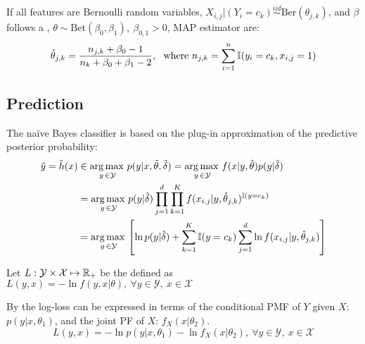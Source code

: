 If all features are Bernoulli random variables, $X_{i,j}|(Y_i=c_k)\overset{iid}{\sim}\text{Ber}(\theta_{j,k})$, and $\beta$ follows a , $\theta\sim\text{Bet}(\beta_0,\beta_1),\ \beta_{0,1}>0$, MAP estimator are:
\begin{equation*}
    \hat{\theta}_{j,k} = \frac{n_{j,k}+\beta_0-1}{n_k+\beta_0+\beta_1-2},\ \text{ where } n_{j,k}=\sum_{i=1}^n\operatorname{\mathbb{I}}(y_i=c_k,x_{i,j}=1)
\end{equation*}






\subsection{Prediction}
The naïve Bayes classifier is based on the plug-in approximation of the predictive posterior probability:
\begin{align*}
    \hat{y}=\hat{h}(x) &\in   \operatorname*{arg\,max\,}_{y\,\in\mathcal{Y}}p(y|x,\Tilde{\theta},\Tilde{\delta})  = \operatorname*{arg\,max\,}_{y\,\in\mathcal{Y}} f(x|y,\hat{\theta})p(y|\hat{\delta})\\
    &= \operatorname*{arg\,max\,}_{y\,\in\mathcal{Y}}p(y|\hat{\delta})\prod_{j=1}^d\prod_{k=1}^K  f(x_{i,j}|y,\hat{\theta}_{j,k})^{\operatorname{\mathbb{I}}(y=c_k)}\\
    &= \operatorname*{arg\,max\,}_{y\,\in\mathcal{Y}}\left[ \ln p(y|\hat{\delta})+\sum_{k=1}^K\operatorname{\mathbb{I}}(y=c_k)\sum_{j=1}^d  \ln f(x_{i,j}|y,\hat{\theta}_{j,k})\right]
\end{align*}




\clearpage
Let $L:\mathcal{Y}\times\mathcal{X}\mapsto\operatorname{\mathbb{R}}_+$ be the  defined as $L(y,x) = -\ln f(y,x|\theta),\ \forall y\in\mathcal{Y},\ x\in\mathcal{X}$









By  the log-loss can be expressed in terms of the conditional PMF of $Y$ given $X$: $p(y|x,\theta_1)$, and the joint PF of $X$: $f_X(x|\theta_2)$.
\begin{equation*}
    L(y,x) = -\ln p(y|x,\theta_1)-\ln f_X(x|\theta_2),\ \forall y\in\mathcal{Y},\ x\in\mathcal{X}
\end{equation*}











